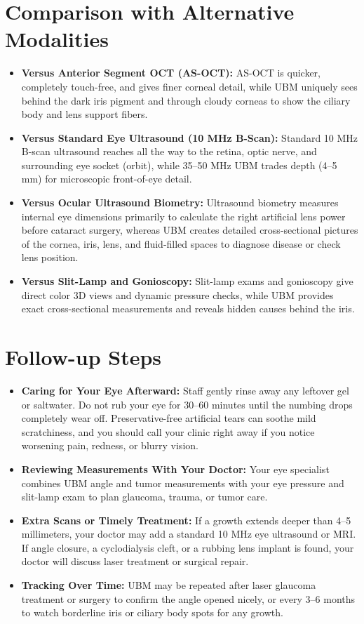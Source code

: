\section{Comparison with Alternative Modalities}

\begin{itemize}
    \item \textbf{Versus Anterior Segment OCT (AS-OCT):} AS-OCT is quicker, completely touch-free, and gives finer corneal detail, while UBM uniquely sees behind the dark iris pigment and through cloudy corneas to show the ciliary body and lens support fibers.
    \item \textbf{Versus Standard Eye Ultrasound (10 MHz B-Scan):} Standard 10 MHz B-scan ultrasound reaches all the way to the retina, optic nerve, and surrounding eye socket (orbit), while 35--50 MHz UBM trades depth (4--5 mm) for microscopic front-of-eye detail.
    \item \textbf{Versus Ocular Ultrasound Biometry:} Ultrasound biometry measures internal eye dimensions primarily to calculate the right artificial lens power before cataract surgery, whereas UBM creates detailed cross-sectional pictures of the cornea, iris, lens, and fluid-filled spaces to diagnose disease or check lens position.
    \item \textbf{Versus Slit-Lamp and Gonioscopy:} Slit-lamp exams and gonioscopy give direct color 3D views and dynamic pressure checks, while UBM provides exact cross-sectional measurements and reveals hidden causes behind the iris.
\end{itemize}

\section{Follow-up Steps}

\begin{itemize}
    \item \textbf{Caring for Your Eye Afterward:} Staff gently rinse away any leftover gel or saltwater. Do not rub your eye for 30--60 minutes until the numbing drops completely wear off. Preservative-free artificial tears can soothe mild scratchiness, and you should call your clinic right away if you notice worsening pain, redness, or blurry vision.
    \item \textbf{Reviewing Measurements With Your Doctor:} Your eye specialist combines UBM angle and tumor measurements with your eye pressure and slit-lamp exam to plan glaucoma, trauma, or tumor care.
    \item \textbf{Extra Scans or Timely Treatment:} If a growth extends deeper than 4--5 millimeters, your doctor may add a standard 10 MHz eye ultrasound or MRI. If angle closure, a cyclodialysis cleft, or a rubbing lens implant is found, your doctor will discuss laser treatment or surgical repair.
    \item \textbf{Tracking Over Time:} UBM may be repeated after laser glaucoma treatment or surgery to confirm the angle opened nicely, or every 3--6 months to watch borderline iris or ciliary body spots for any growth.
\end{itemize}

